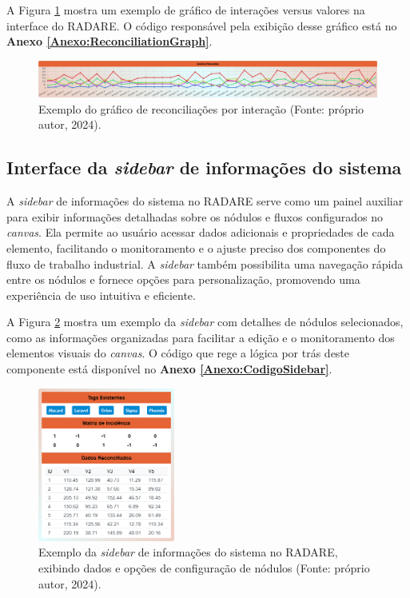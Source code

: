 A Figura \ref{Fig:ReconciliationGraph} mostra um exemplo de gráfico de interações versus valores na interface do RADARE. O código responsável pela exibição desse gráfico está no \textbf{Anexo \ref{Anexo:ReconciliationGraph}}.

\begin{figure}[htbp]
    \centering
    \includegraphics[width=1\textwidth]{figuras/interface-grafico.png}
    \caption{Exemplo do gráfico de reconciliações por interação (Fonte: próprio autor, 2024).}
    \label{Fig:ReconciliationGraph}
\end{figure}

\subsection{Interface da \textit{sidebar} de informações do sistema}

A \textit{sidebar} de informações do sistema no RADARE serve como um painel auxiliar para exibir informações detalhadas sobre os nódulos e fluxos configurados no \textit{canvas}. Ela permite ao usuário acessar dados adicionais e propriedades de cada elemento, facilitando o monitoramento e o ajuste preciso dos componentes do fluxo de trabalho industrial. A \textit{sidebar} também possibilita uma navegação rápida entre os nódulos e fornece opções para personalização, promovendo uma experiência de uso intuitiva e eficiente.

A Figura \ref{Fig:SidebarInterface} mostra um exemplo da \textit{sidebar} com detalhes de nódulos selecionados, como as informações organizadas para facilitar a edição e o monitoramento dos elementos visuais do \textit{canvas}. O código que rege a lógica por trás deste componente está disponível no \textbf{Anexo \ref{Anexo:CodigoSidebar}}.

\begin{figure}[htbp]
    \centering
    \includegraphics[width=0.4\textwidth]{figuras/interface-sidebar.png}
    \caption{Exemplo da \textit{sidebar} de informações do sistema no RADARE, exibindo dados e opções de configuração de nódulos (Fonte: próprio autor, 2024).}
    \label{Fig:SidebarInterface}
\end{figure}

